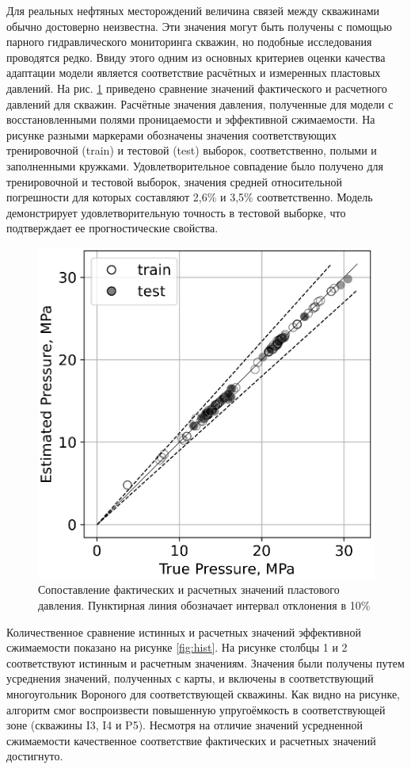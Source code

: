 \documentclass{article}
\begin{document}
Для реальных нефтяных месторождений величина связей между скважинами обычно достоверно неизвестна. Эти значения могут быть получены с помощью парного гидравлического мониторинга скважин, но подобные исследования проводятся редко. Ввиду этого одним из основных критериев оценки качества адаптации модели является соответствие расчётных и измеренных пластовых давлений. На рис. \ref{fig:cp} приведено сравнение значений фактического и расчетного давлений для скважин. Расчётные значения давления, полученные для модели с восстановленными полями проницаемости и эффективной сжимаемости. На рисунке разными маркерами обозначены значения соответствующих тренировочной (train) и тестовой (test) выборок, соответственно, полыми и заполненными кружками. Удовлетворительное совпадение было получено для тренировочной и тестовой выборок, значения средней относительной погрешности для которых составляют 2,6\% и 3,5\% соответственно. Модель демонстрирует удовлетворительную точность в тестовой выборке, что подтверждает ее прогностические свойства.

\begin{figure}
	\centering
	\includegraphics[width=0.5\linewidth]{images/fig6.eps}
	\caption{Сопоставление фактических и расчетных значений пластового давления. Пунктирная линия обозначает интервал отклонения в 10\%}
	\label{fig:cp}
\end{figure}

Количественное сравнение истинных и расчетных значений эффективной сжимаемости показано на рисунке \ref{fig:hist}. На рисунке столбцы 1 и 2 соответствуют истинным и расчетным значениям. Значения были получены путем усреднения значений, полученных с карты, и включены в соответствующий многоугольник Вороного для соответствующей скважины. Как видно на рисунке, алгоритм смог воспроизвести повышенную упругоёмкость в соответствующей зоне (скважины I3, I4 и P5). Несмотря на отличие значений усредненной сжимаемости качественное соответствие фактических и расчетных значений достигнуто.
\end{document}
